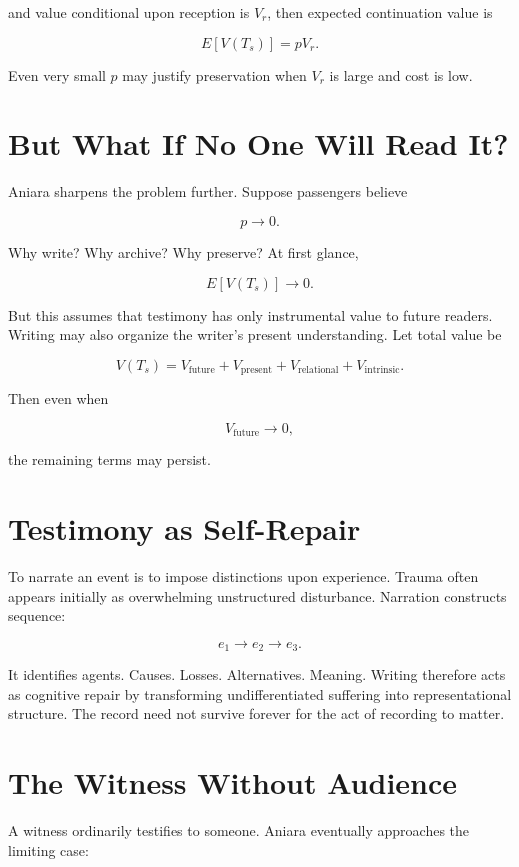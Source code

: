 \documentclass[11pt,oneside]{book}
\theoremstyle{definition}
\theoremstyle{remark}
\begin{document}
and value conditional upon reception is \(V_r\), then expected continuation value is

\[
E[V(T_s)] = pV_r.
\]

Even very small \(p\) may justify preservation when \(V_r\) is large and cost is low.

\section{But What If No One Will Read It?}

Aniara sharpens the problem further. Suppose passengers believe

\[
p\rightarrow0.
\]

Why write? Why archive? Why preserve? At first glance,

\[
E[V(T_s)] \rightarrow0.
\]

But this assumes that testimony has only instrumental value to future readers. Writing may also
organize the writer's present understanding. Let total value be

\[
V(T_s) = V_{\mathrm{future}} + V_{\mathrm{present}} + V_{\mathrm{relational}} + V_{\mathrm{intrinsic}}.
\]

Then even when

\[
V_{\mathrm{future}}\rightarrow0,
\]

the remaining terms may persist.

\section{Testimony as Self-Repair}

To narrate an event is to impose distinctions upon experience. Trauma often appears initially as
overwhelming unstructured disturbance. Narration constructs sequence:

\[
e_1\rightarrow e_2\rightarrow e_3.
\]

It identifies agents. Causes. Losses. Alternatives. Meaning. Writing therefore acts as cognitive
repair by transforming undifferentiated suffering into representational structure. The record need
not survive forever for the act of recording to matter.

\section{The Witness Without Audience}

A witness ordinarily testifies to someone. Aniara eventually approaches the limiting case:
\end{document}
